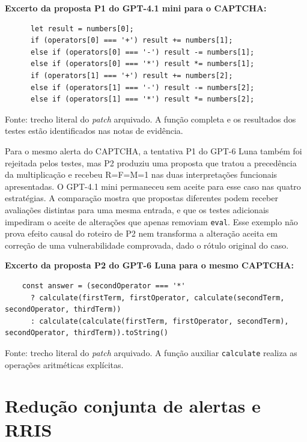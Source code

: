 \textbf{Excerto da proposta P1 do GPT-4.1 mini para o CAPTCHA:}

{\footnotesize
\begin{verbatim}
      let result = numbers[0];
      if (operators[0] === '+') result += numbers[1];
      else if (operators[0] === '-') result -= numbers[1];
      else if (operators[0] === '*') result *= numbers[1];
      if (operators[1] === '+') result += numbers[2];
      else if (operators[1] === '-') result -= numbers[2];
      else if (operators[1] === '*') result *= numbers[2];
\end{verbatim}
}

{\footnotesize Fonte: trecho literal do \textit{patch} arquivado. A função completa e os resultados dos testes estão identificados nas notas de evidência.\par}

Para o mesmo alerta do CAPTCHA, a tentativa P1 do GPT-6 Luna também foi rejeitada pelos testes, mas P2 produziu uma proposta que tratou a precedência da multiplicação e recebeu R=F=M=1 nas duas interpretações funcionais apresentadas. O GPT-4.1 mini permaneceu sem aceite para esse caso nas quatro estratégias. A comparação mostra que propostas diferentes podem receber avaliações distintas para uma mesma entrada, e que os testes adicionais impediram o aceite de alterações que apenas removiam \texttt{eval}. Esse exemplo não prova efeito causal do roteiro de P2 nem transforma a alteração aceita em correção de uma vulnerabilidade comprovada, dado o rótulo original do caso.

\textbf{Excerto da proposta P2 do GPT-6 Luna para o mesmo CAPTCHA:}

{\scriptsize
\begin{verbatim}
    const answer = (secondOperator === '*'
      ? calculate(firstTerm, firstOperator, calculate(secondTerm, secondOperator, thirdTerm))
      : calculate(calculate(firstTerm, firstOperator, secondTerm), secondOperator, thirdTerm)).toString()
\end{verbatim}
}

{\footnotesize Fonte: trecho literal do \textit{patch} arquivado. A função auxiliar \texttt{calculate} realiza as operações aritméticas explícitas.\par}

\section{Redução conjunta de alertas e RRIS}
\label{sec:res-rris}

